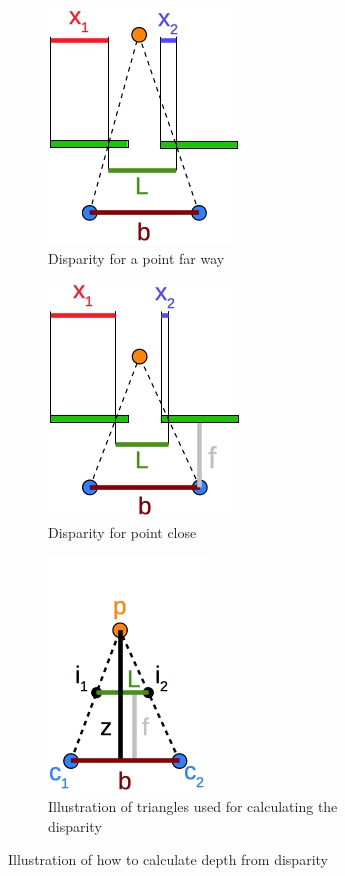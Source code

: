 \begin{figure}[ht]
  \centering
  \begin{subfigure}[t]{0.3\textwidth}
    \centering\includegraphics[scale=1]{figures/disparity_ex1.jpg}
    \caption{Disparity for a point far way\label{fig:disp_long}}
  \end{subfigure}\hspace{0.5cm}
  \begin{subfigure}[t]{0.3\textwidth}
    \centering\includegraphics[scale=1]{figures/disparity_ex2}
    \caption{Disparity for point close\label{fig:disp_short}}
  \end{subfigure}\hspace{0.5cm}
  \begin{subfigure}[t]{0.3\textwidth}
    \centering\includegraphics[scale=1]{figures/disparity_ex3}
    \caption{Illustration of triangles used for calculating the disparity\label{fig:bfz_disp}}
  \end{subfigure}
  \caption{Illustration of how to calculate depth from disparity\label{fig:dispall}}
\end{figure}

